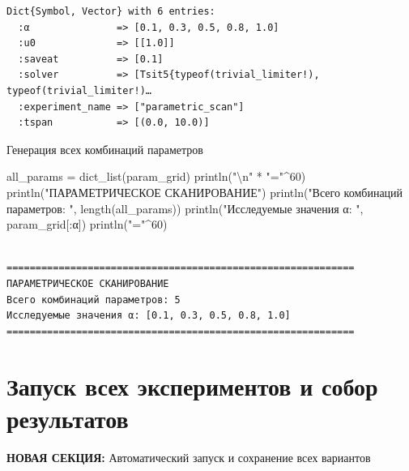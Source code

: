 \documentclass[
  english,
  russian,
  12pt,
  a4paper,
  DIV=11,
  numbers=noendperiod]{scrreprt}
\newenvironment{Shaded}{\begin{snugshade}}{\end{snugshade}}
\newcommand{\FloatTok}[1]{\textcolor[rgb]{0.68,0.00,0.00}{#1}}
\newcommand{\FunctionTok}[1]{\textcolor[rgb]{0.28,0.35,0.67}{#1}}
\newcommand{\NormalTok}[1]{\textcolor[rgb]{0.00,0.23,0.31}{#1}}
\newcommand{\OperatorTok}[1]{\textcolor[rgb]{0.37,0.37,0.37}{#1}}
\newcommand{\SpecialCharTok}[1]{\textcolor[rgb]{0.37,0.37,0.37}{#1}}
\newcommand{\StringTok}[1]{\textcolor[rgb]{0.13,0.47,0.30}{#1}}
\begin{document}
\begin{verbatim}
Dict{Symbol, Vector} with 6 entries:
  :α               => [0.1, 0.3, 0.5, 0.8, 1.0]
  :u0              => [[1.0]]
  :saveat          => [0.1]
  :solver          => [Tsit5{typeof(trivial_limiter!), typeof(trivial_limiter!)…
  :experiment_name => ["parametric_scan"]
  :tspan           => [(0.0, 10.0)]
\end{verbatim}

Генерация всех комбинаций параметров

\begin{Shaded}
\begin{Highlighting}[]
\NormalTok{all\_params }\OperatorTok{=} \FunctionTok{dict\_list}\NormalTok{(param\_grid)}
\FunctionTok{println}\NormalTok{(}\StringTok{"}\SpecialCharTok{\textbackslash{}n}\StringTok{"} \OperatorTok{*} \StringTok{"="}\OperatorTok{\^{}}\FloatTok{60}\NormalTok{)}
\FunctionTok{println}\NormalTok{(}\StringTok{"ПАРАМЕТРИЧЕСКОЕ СКАНИРОВАНИЕ"}\NormalTok{)}
\FunctionTok{println}\NormalTok{(}\StringTok{"Всего комбинаций параметров: "}\NormalTok{, }\FunctionTok{length}\NormalTok{(all\_params))}
\FunctionTok{println}\NormalTok{(}\StringTok{"Исследуемые значения α: "}\NormalTok{, param\_grid[}\OperatorTok{:}\NormalTok{α])}
\FunctionTok{println}\NormalTok{(}\StringTok{"="}\OperatorTok{\^{}}\FloatTok{60}\NormalTok{)}
\end{Highlighting}
\end{Shaded}

\begin{verbatim}

============================================================
ПАРАМЕТРИЧЕСКОЕ СКАНИРОВАНИЕ
Всего комбинаций параметров: 5
Исследуемые значения α: [0.1, 0.3, 0.5, 0.8, 1.0]
============================================================
\end{verbatim}

\section{Запуск всех экспериментов и собор
результатов}\label{ux437ux430ux43fux443ux441ux43a-ux432ux441ux435ux445-ux44dux43aux441ux43fux435ux440ux438ux43cux435ux43dux442ux43eux432-ux438-ux441ux43eux431ux43eux440-ux440ux435ux437ux443ux43bux44cux442ux430ux442ux43eux432}

\textbf{НОВАЯ СЕКЦИЯ:} Автоматический запуск и сохранение всех вариантов
\end{document}
